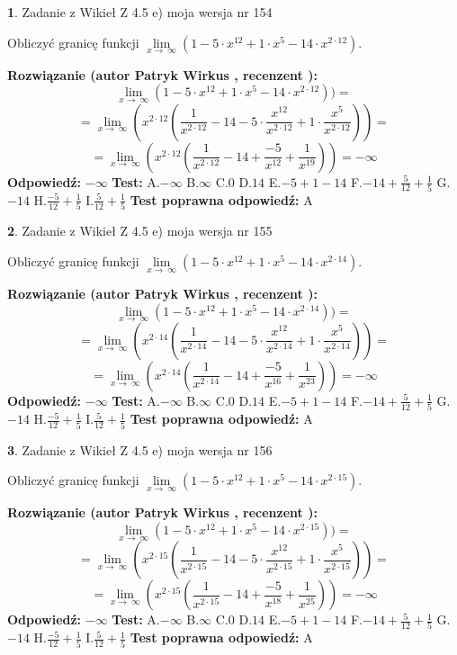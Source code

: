 \documentclass[12pt, a4paper]{article}
\theoremstyle{definition} %
\newtheorem{zad}{}
\newcommand{\zadStart}[1]{\begin{zad}#1\newline}
\newcommand{\zadStop}{\end{zad}}
\newcommand{\rozwStart}[2]{\noindent \textbf{Rozwiązanie (autor #1 , recenzent #2): }\newline}
\newcommand{\rozwStop}{\newline}
\newcommand{\odpStart}{\noindent \textbf{Odpowiedź:}\newline}
\newcommand{\odpStop}{\newline}
\newcommand{\testStart}{\noindent \textbf{Test:}\newline}
\newcommand{\testStop}{\newline}
\newcommand{\kluczStart}{\noindent \textbf{Test poprawna odpowiedź:}\newline}
\newcommand{\kluczStop}{\newline}
\begin{document}
\zadStart{Zadanie z Wikieł Z 4.5 e) moja wersja nr 154}



Obliczyć granicę funkcji  $\lim\limits_{x\to\ \infty}(1 - 5 \cdot x^{12}+1 \cdot x^{5}- 14 \cdot x^{2\cdot12})$.
\zadStop
\rozwStart{Patryk Wirkus}{}
$$\lim\limits_{x\to\ \infty}(1 - 5 \cdot x^{12}+1 \cdot x^{5}- 14 \cdot x^{2\cdot12}))=$$
$$=\lim\limits_{x\to\ \infty}(x^{2\cdot12}(\frac{1}{x^{2\cdot12}}-14 -5 \cdot \frac{x^{12}}{x^{2\cdot12}}+1 \cdot \frac{x^{5}}{x^{2\cdot12}}))=$$
$$=\lim\limits_{x\to\ \infty}(x^{2\cdot12}(\frac{1}{x^{2\cdot12}}-14 + \frac{-5}{x^{12}}+ \frac{1}{x^{19}}))=-\infty$$
\rozwStop
\odpStart
$-\infty$
\odpStop
\testStart
A.$-\infty$ B.$\infty$ C.$0$ D.$14$ E.$-5 + 1 - 14$
F.$-14+\frac{5}{12}+\frac{1}{5}$ G.$-14$
H.$\frac{-5}{12}+\frac{1}{5}$
I.$\frac{5}{12}+\frac{1}{5}$
\testStop
\kluczStart
A
\kluczStop



\zadStart{Zadanie z Wikieł Z 4.5 e) moja wersja nr 155}



Obliczyć granicę funkcji  $\lim\limits_{x\to\ \infty}(1 - 5 \cdot x^{12}+1 \cdot x^{5}- 14 \cdot x^{2\cdot14})$.
\zadStop
\rozwStart{Patryk Wirkus}{}
$$\lim\limits_{x\to\ \infty}(1 - 5 \cdot x^{12}+1 \cdot x^{5}- 14 \cdot x^{2\cdot14}))=$$
$$=\lim\limits_{x\to\ \infty}(x^{2\cdot14}(\frac{1}{x^{2\cdot14}}-14 -5 \cdot \frac{x^{12}}{x^{2\cdot14}}+1 \cdot \frac{x^{5}}{x^{2\cdot14}}))=$$
$$=\lim\limits_{x\to\ \infty}(x^{2\cdot14}(\frac{1}{x^{2\cdot14}}-14 + \frac{-5}{x^{16}}+ \frac{1}{x^{23}}))=-\infty$$
\rozwStop
\odpStart
$-\infty$
\odpStop
\testStart
A.$-\infty$ B.$\infty$ C.$0$ D.$14$ E.$-5 + 1 - 14$
F.$-14+\frac{5}{12}+\frac{1}{5}$ G.$-14$
H.$\frac{-5}{12}+\frac{1}{5}$
I.$\frac{5}{12}+\frac{1}{5}$
\testStop
\kluczStart
A
\kluczStop



\zadStart{Zadanie z Wikieł Z 4.5 e) moja wersja nr 156}



Obliczyć granicę funkcji  $\lim\limits_{x\to\ \infty}(1 - 5 \cdot x^{12}+1 \cdot x^{5}- 14 \cdot x^{2\cdot15})$.
\zadStop
\rozwStart{Patryk Wirkus}{}
$$\lim\limits_{x\to\ \infty}(1 - 5 \cdot x^{12}+1 \cdot x^{5}- 14 \cdot x^{2\cdot15}))=$$
$$=\lim\limits_{x\to\ \infty}(x^{2\cdot15}(\frac{1}{x^{2\cdot15}}-14 -5 \cdot \frac{x^{12}}{x^{2\cdot15}}+1 \cdot \frac{x^{5}}{x^{2\cdot15}}))=$$
$$=\lim\limits_{x\to\ \infty}(x^{2\cdot15}(\frac{1}{x^{2\cdot15}}-14 + \frac{-5}{x^{18}}+ \frac{1}{x^{25}}))=-\infty$$
\rozwStop
\odpStart
$-\infty$
\odpStop
\testStart
A.$-\infty$ B.$\infty$ C.$0$ D.$14$ E.$-5 + 1 - 14$
F.$-14+\frac{5}{12}+\frac{1}{5}$ G.$-14$
H.$\frac{-5}{12}+\frac{1}{5}$
I.$\frac{5}{12}+\frac{1}{5}$
\testStop
\kluczStart
A
\kluczStop
\end{document}
